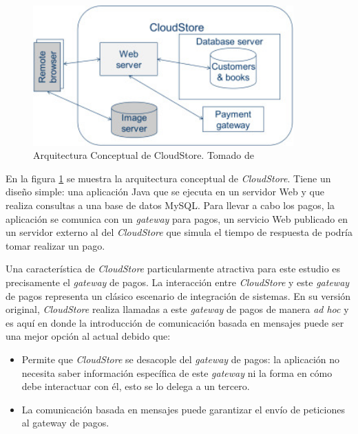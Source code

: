 \documentclass[11pt, twoside]{report}
\begin{document}
\begin{figure}[h]
  \centering
  \includegraphics[width=10cm]{conceptual-cloudstore-architecture}
  \caption{\small{Arquitectura Conceptual de CloudStore. Tomado de \cite{happe-et-al}}}
  \label{fig:cloudstore-conceptual}
\end{figure}

En la figura \ref{fig:cloudstore-conceptual} se muestra la arquitectura conceptual de \emph{CloudStore}. Tiene un diseño simple: una aplicación Java que se ejecuta en un servidor Web y que realiza consultas a una base de datos MySQL. Para llevar a cabo los pagos, la aplicación se comunica con un \emph{gateway} para pagos, un servicio Web publicado en un servidor externo al del \emph{CloudStore} que simula el tiempo de respuesta de podría tomar realizar un pago.

Una característica de \emph{CloudStore} particularmente atractiva para este estudio es precisamente el \emph{gateway} de pagos. La interacción entre \emph{CloudStore} y este \emph{gateway} de pagos representa un clásico escenario de integración de sistemas. En su versión original, \emph{CloudStore} realiza llamadas a este \emph{gateway} de pagos de manera \emph{ad hoc} y es aquí en donde la introducción de comunicación basada en mensajes puede ser una mejor opción al actual debido que:
\begin{itemize}
    \item Permite que \emph{CloudStore} se desacople del \emph{gateway} de pagos: la aplicación no necesita saber información específica de este \emph{gateway} ni la forma en cómo debe interactuar con él, esto se lo delega a un tercero. 
    \item La comunicación basada en mensajes puede garantizar el envío de peticiones al gateway de pagos.
\end{itemize}
\end{document}
